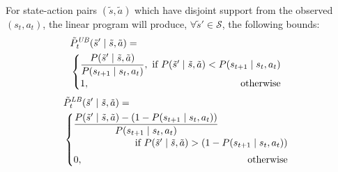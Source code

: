\begin{theorem}
\label{theorem: ub disjoint}
For state-action pairs $(\tilde{s}, \tilde{a})$ which have disjoint support from the observed $(s_t, a_t)$, the linear program will produce, $\forall \tilde{s}' \in \mathcal{S}$, the following bounds: 
\[
\begin{aligned}
&\tilde{P}_{t}^{\it UB}(\tilde{s}' \mid \tilde{s}, \tilde{a}) = \\ 
&\begin{cases}
\dfrac{P(\tilde{s}' \mid \tilde{s}, \tilde{a})}{P(s_{t+1} \mid s_t, a_t)}, \hfill
\textnormal{ if }P(\tilde{s}' \mid \tilde{s}, \tilde{a}) < P(s_{t+1} \mid s_t, a_t) \\[3pt]
1, \hfill \textnormal{ otherwise}
\end{cases}
\end{aligned}
\]
\[
\begin{aligned}
&\tilde{P}_{t}^{\it LB}(\tilde{s}' \mid \tilde{s}, \tilde{a}) =\\
&\begin{cases}
\text{$\dfrac{P(\tilde{s}' \mid \tilde{s}, \tilde{a}) - (1 - P(s_{t+1} \mid s_t, a_t))}{P(s_{t+1} \mid s_t, a_t)}$} \hspace*{2.5cm} \\ 
\hfill \textnormal{ if }P(\tilde{s}' \mid \tilde{s}, \tilde{a}) >(1-P(s_{t+1}\mid s_t,a_t))\\[3pt]
0, \hfill \textnormal{ otherwise}
\end{cases}
\end{aligned}
\]
\end{theorem}
